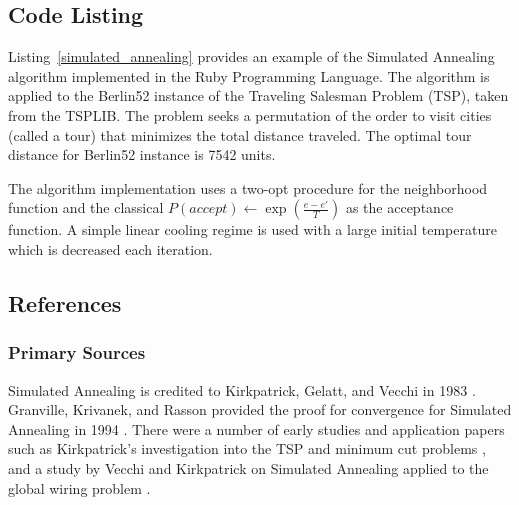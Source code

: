 \subsection{Code Listing}
Listing~\ref{simulated_annealing} provides an example of the Simulated Annealing algorithm implemented in the Ruby Programming Language. 
The algorithm is applied to the Berlin52 instance of the Traveling Salesman Problem (TSP), taken from the TSPLIB. The problem seeks a permutation of the order to visit cities (called a tour) that minimizes the total distance traveled. The optimal tour distance for Berlin52 instance is 7542 units.

The algorithm implementation uses a two-opt procedure for the neighborhood function and the classical $P(accept) \leftarrow \exp(\frac{e-e'}{T})$ as the acceptance function. A simple linear cooling regime is used with a large initial temperature which is decreased each iteration.



\subsection{References}

% 
% 
\subsubsection{Primary Sources}
Simulated Annealing is credited to Kirkpatrick, Gelatt, and Vecchi in 1983 \cite{Kirkpatrick1983}. Granville, Krivanek, and Rasson provided the proof for convergence for Simulated Annealing in 1994 \cite{Granville1994}.
There were a number of early studies and application papers such as Kirkpatrick's investigation into the TSP and minimum cut problems \cite{Kirkpatrick1983a}, and a study by Vecchi and Kirkpatrick on Simulated Annealing applied to the global wiring problem \cite{Vecchi1983}.

